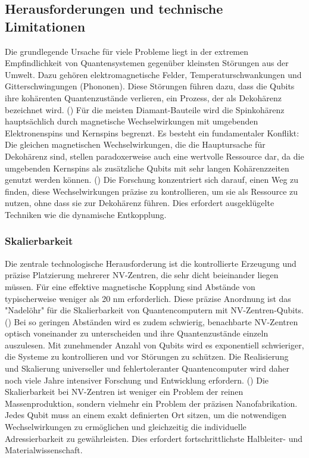 \subsection{Herausforderungen und technische Limitationen}
Die grundlegende Ursache für viele Probleme liegt in der extremen Empfindlichkeit von Quantensystemen gegenüber kleinsten Störungen aus der Umwelt. Dazu gehören elektromagnetische Felder, Temperaturschwankungen und Gitterschwingungen (Phononen). Diese Störungen führen dazu, dass die Qubits ihre kohärenten Quantenzustände verlieren, ein Prozess, der als Dekohärenz bezeichnet wird. (\cite{gmbhCCGFachartikelQuantencomputer2025})
Für die meisten Diamant-Bauteile wird die Spinkohärenz hauptsächlich durch magnetische Wechselwirkungen mit umgebenden Elektronenspins und Kernspins begrenzt. Es besteht ein fundamentaler Konflikt: Die gleichen magnetischen Wechselwirkungen, die die Hauptursache für Dekohärenz sind, stellen paradoxerweise auch eine wertvolle Ressource dar, da die umgebenden Kernspins als zusätzliche Qubits mit sehr langen Kohärenzzeiten genutzt werden können. (\cite{childressDiamondNVCenters2013}) Die Forschung konzentriert sich darauf, einen Weg zu finden, diese Wechselwirkungen präzise zu kontrollieren, um sie als Ressource zu nutzen, ohne dass sie zur Dekohärenz führen. Dies erfordert ausgeklügelte Techniken wie die dynamische Entkopplung.
\subsubsection{Skalierbarkeit}
Die zentrale technologische Herausforderung ist die kontrollierte Erzeugung und präzise Platzierung mehrerer NV-Zentren, die sehr dicht beieinander liegen müssen. Für eine effektive magnetische Kopplung sind Abstände von typischerweise weniger als 20 nm erforderlich. Diese präzise Anordnung ist das "Nadelöhr" für die Skalierbarkeit von Quantencomputern mit NV-Zentren-Qubits. (\cite{NVZentrenStickstoffFehlstellenDLR}) Bei so geringen Abständen wird es zudem schwierig, benachbarte NV-Zentren optisch voneinander zu unterscheiden und ihre Quantenzustände einzeln auszulesen. Mit zunehmender Anzahl von Qubits wird es exponentiell schwieriger, die Systeme zu kontrollieren und vor Störungen zu schützen. Die Realisierung und Skalierung universeller und fehlertoleranter Quantencomputer wird daher noch viele Jahre intensiver Forschung und Entwicklung erfordern. (\cite{UngeahnteMoglichkeitenDurch})
Die Skalierbarkeit bei NV-Zentren ist weniger ein Problem der reinen Massenproduktion, sondern vielmehr ein Problem der präzisen Nanofabrikation. Jedes Qubit muss an einem exakt definierten Ort sitzen, um die notwendigen Wechselwirkungen zu ermöglichen und gleichzeitig die individuelle Adressierbarkeit zu gewährleisten. Dies erfordert fortschrittlichste Halbleiter- und Materialwissenschaft.
